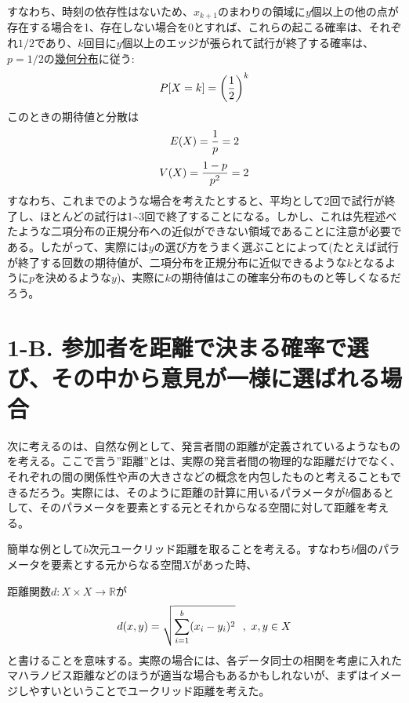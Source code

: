 \documentclass[letterpaper,10pt,english]{sphinxmanual}
\begin{document}
すなわち、時刻の依存性はないため、\(x_{k+1}\)のまわりの領域に\(y\)個以上の他の点が存在する場合を1、存在しない場合を0とすれば、これらの起こる確率は、それぞれ\(1/2\)であり、\(k\)回目に\(y\)個以上のエッジが張られて試行が終了する確率は、\(p=1/2\)の\href{http://ja.wikipedia.org/wiki/\%E5\%B9\%BE\%E4\%BD\%95\%E5\%88\%86\%E5\%B8\%83}{幾何分布}に従う:
\begin{gather}
\begin{split}P[X=k] = \left( \frac{1}{2} \right)^{k}\end{split}\notag
\end{gather}
このときの期待値と分散は
\begin{gather}
\begin{split}E(X) = \frac{1}{p} = 2\end{split}\notag
\end{gather}\begin{gather}
\begin{split}V(X) = \frac{1-p}{p^{2}} = 2\end{split}\notag
\end{gather}
すなわち、これまでのような場合を考えたとすると、平均として2回で試行が終了し、ほとんどの試行は1\textasciitilde{}3回で終了することになる。しかし、これは先程述べたような二項分布の正規分布への近似ができない領域であることに注意が必要である。したがって、実際には\(y\)の選び方をうまく選ぶことによって(たとえば試行が終了する回数の期待値が、二項分布を正規分布に近似できるような\(k\)となるように\(p\)を決めるような\(y\))、実際に\(k\)の期待値はこの確率分布のものと等しくなるだろう。


\section{1-B. 参加者を距離で決まる確率で選び、その中から意見が一様に選ばれる場合}
\label{draft:b}
次に考えるのは、自然な例として、発言者間の距離が定義されているようなものを考える。ここで言う''距離''とは、実際の発言者間の物理的な距離だけでなく、それぞれの間の関係性や声の大きさなどの概念を内包したものと考えることもできるだろう。実際には、そのように距離の計算に用いるパラメータが\(b\)個あるとして、そのパラメータを要素とする元とそれからなる空間に対して距離を考える。

簡単な例として\(b\)次元ユークリッド距離を取ることを考える。すなわち\(b\)個のパラメータを要素とする元からなる空間\(X\)があった時、

距離関数\(d: X \times X \rightarrow \mathbb{R}\)が
\begin{gather}
\begin{split}d(x, y) = \sqrt{\sum_{i=1}^{b}(x_{i}-y_{i})^{2}}\ \ ,\ x,y\in X\end{split}\notag
\end{gather}
と書けることを意味する。実際の場合には、各データ同士の相関を考慮に入れたマハラノビス距離などのほうが適当な場合もあるかもしれないが、まずはイメージしやすいということでユークリッド距離を考えた。
\end{document}
